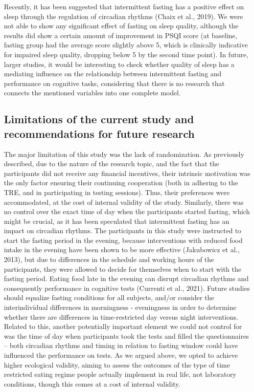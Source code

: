\documentclass[authordate, empirical,issue]{jote-new-article}
\begin{document}
Recently, it has been suggested that intermittent fasting has a positive effect on sleep through the regulation of circadian rhythms (Chaix et al., 2019). We were not able to show any significant effect of fasting on sleep quality, although the results did show a certain amount of improvement in PSQI score (at baseline, fasting group had the average score slightly above 5, which is clinically indicative for impaired sleep quality, dropping below 5 by the second time point). In future, larger studies, it would be interesting to check whether quality of sleep has a mediating influence on the relationship between intermittent fasting and performance on cognitive tasks, considering that there is no research that connects the mentioned variables into one complete model.








\subsection{Limitations of the current study and recommendations for future research}



The major limitation of this study was the lack of randomization. As previously described, due to the nature of the research topic, and the fact that the participants did not receive any financial incentives, their intrinsic motivation was the only factor ensuring their continuing cooperation (both in adhering to the TRE, and in participating in testing sessions). Thus, their preferences were accommodated, at the cost of internal validity of the study. Similarly, there was no control over the exact time of day when the participants started fasting, which might be crucial, as it has been speculated that intermittent fasting has an impact on circadian rhythms. The participants in this study were instructed to start the fasting period in the evening, because interventions with reduced food intake in the evening have been shown to be more effective (Jakubowicz et al., 2013), but due to differences in the schedule and working hours of the participants, they were allowed to decide for themselves when to start with the fasting period. Eating food late in the evening can disrupt circadian rhythms and consequently performance in cognitive tests (Currenti et al., 2021). Future studies should equalize fasting conditions for all subjects, and/or consider the interindividual differences in morningness - eveningness in order to determine whether there are differences in time-restricted day versus night interventions. Related to this, another potentially important element we could not control for was the time of day when participants took the tests and filled the questionnaires -- both circadian rhythms and timing in relation to fasting window could have influenced the performance on tests. As we argued above, we opted to achieve higher ecological validity, aiming to assess the outcomes of the type of time restricted eating regime people actually implement in real life, not laboratory conditions, though this comes at a cost of internal validity.
\end{document}
